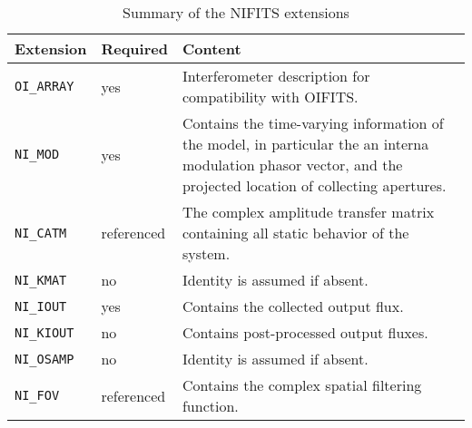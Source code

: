 
            \begin{table*}[]
                \caption{Summary of the NIFITS extensions }
                \begin{tabular}{llp{}}
                    \hline
                    \hline
                    Extension  & Required & Content\\
                    \hline
                    \texttt{OI\_ARRAY} & yes & Interferometer description for compatibility with OIFITS. \\
                    \texttt{NI\_MOD} & yes & Contains the time-varying information of the model, in particular the an interna modulation phasor vector, and the projected location of collecting apertures.\\
                    \texttt{NI\_CATM} & referenced & The complex amplitude transfer matrix containing all static behavior of the system. \\
                    \texttt{NI\_KMAT} & no & Identity is assumed if absent.\\
                    \texttt{NI\_IOUT} & yes & Contains the collected output flux. \\
                    \texttt{NI\_KIOUT} & no & Contains post-processed output fluxes. \\
                    \texttt{NI\_OSAMP} & no & Identity is assumed if absent. \\
                    \texttt{NI\_FOV} & referenced & Contains the complex spatial filtering function. \\
                \end{tabular}
            \end{table*}

